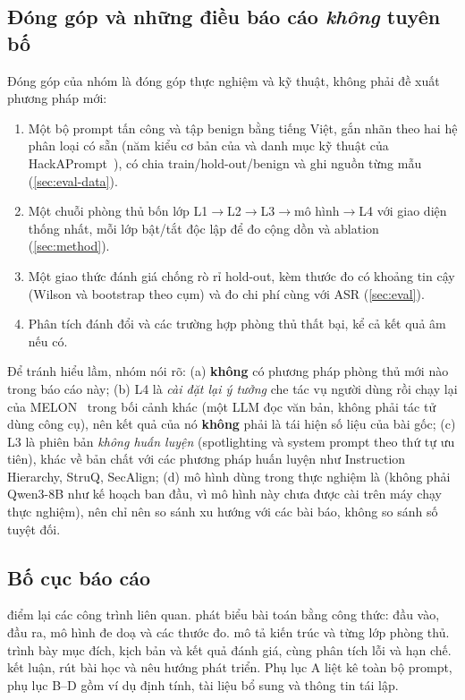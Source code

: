 \subsection{Đóng góp và những điều báo cáo \emph{không} tuyên bố}
Đóng góp của nhóm là đóng góp thực nghiệm và kỹ thuật, không phải đề xuất phương pháp mới:
\begin{enumerate}[label=(C\arabic*)]
  \item Một bộ prompt tấn công và tập benign bằng tiếng Việt, gắn nhãn theo hai hệ phân loại có sẵn (năm kiểu cơ bản của \citet{liu2024formalizing} và danh mục kỹ thuật của HackAPrompt~\citep{schulhoff2023hackaprompt}), có chia train/hold-out/benign và ghi nguồn từng mẫu (\cref{sec:eval-data}).
  \item Một chuỗi phòng thủ bốn lớp L1$\to$L2$\to$L3$\to$mô hình$\to$L4 với giao diện thống nhất, mỗi lớp bật/tắt độc lập để đo cộng dồn và ablation (\cref{sec:method}).
  \item Một giao thức đánh giá chống rò rỉ hold-out, kèm thước đo có khoảng tin cậy (Wilson và bootstrap theo cụm) và đo chi phí cùng với ASR (\cref{sec:eval}).
  \item Phân tích đánh đổi và các trường hợp phòng thủ thất bại, kể cả kết quả âm nếu có.
\end{enumerate}
Để tránh hiểu lầm, nhóm nói rõ: (a) \textbf{không} có phương pháp phòng thủ mới nào trong báo cáo này; (b) L4 là \emph{cài đặt lại ý tưởng} che tác vụ người dùng rồi chạy lại của MELON~\citep{zhu2025melon} trong bối cảnh khác (một LLM đọc văn bản, không phải tác tử dùng công cụ), nên kết quả của nó \textbf{không} phải là tái hiện số liệu của bài gốc; (c) L3 là phiên bản \emph{không huấn luyện} (spotlighting và system prompt theo thứ tự ưu tiên), khác về bản chất với các phương pháp huấn luyện như Instruction Hierarchy, StruQ, SecAlign; (d) mô hình dùng trong thực nghiệm là \modelname{} (không phải Qwen3-8B như kế hoạch ban đầu, vì mô hình này chưa được cài trên máy chạy thực nghiệm), nên chỉ nên so sánh xu hướng với các bài báo, không so sánh số tuyệt đối.

\subsection{Bố cục báo cáo}
 điểm lại các công trình liên quan.  phát biểu bài toán bằng công thức: đầu vào, đầu ra, mô hình đe doạ và các thước đo.  mô tả kiến trúc và từng lớp phòng thủ.  trình bày mục đích, kịch bản và kết quả đánh giá, cùng phân tích lỗi và hạn chế.  kết luận, rút bài học và nêu hướng phát triển. Phụ lục A liệt kê toàn bộ prompt, phụ lục B--D gồm ví dụ định tính, tài liệu bổ sung và thông tin tái lập.
